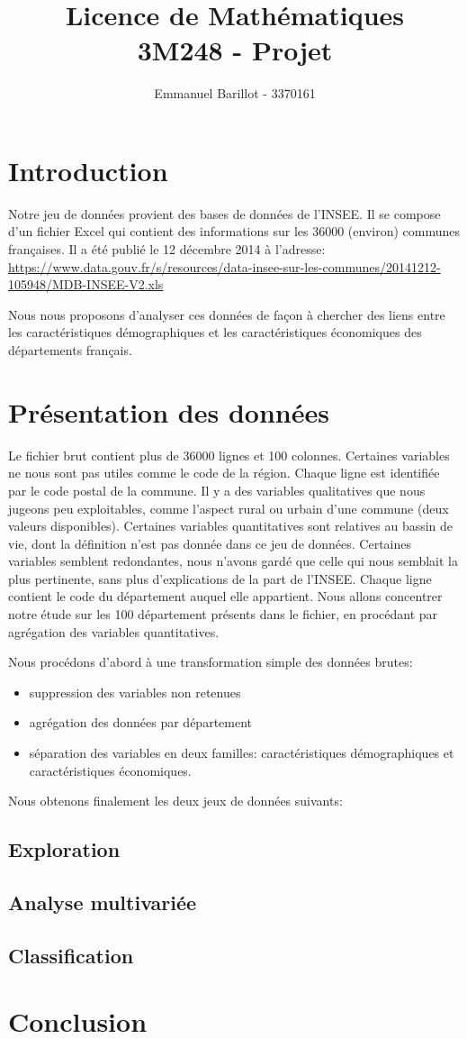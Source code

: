 \documentclass[a4paper,11pt]{article}
\title{Licence de Mathématiques \\3M248 - Projet}
\author{Emmanuel Barillot - 3370161}
\begin{document}
\maketitle



\section{Introduction}
Notre jeu de données provient des bases de données de l'INSEE. Il se compose d'un fichier Excel qui contient des informations sur les 36000 (environ) communes françaises.
Il a été publié le 12 décembre 2014 à l'adresse: 
\href{https://www.data.gouv.fr/s/resources/data-insee-sur-les-communes/20141212-105948/MDB-INSEE-V2.xls}{https://www.data.gouv.fr/s/resources/data-insee-sur-les-communes/20141212-105948/MDB-INSEE-V2.xls}

Nous nous proposons d'analyser ces données de façon à chercher des liens entre les caractéristiques démographiques et les caractéristiques économiques des départements français.

\section{Présentation des données}
Le fichier brut contient plus de 36000 lignes et 100 colonnes.
Certaines variables ne nous sont pas utiles comme le code de la région.
Chaque ligne est identifiée par le code postal de la commune.
Il y a des variables qualitatives que nous jugeons peu exploitables, comme l'aspect rural ou urbain d'une commune (deux valeurs disponibles).
Certaines variables quantitatives sont relatives au bassin de vie, dont la définition n'est pas donnée dans ce jeu de données.
Certaines variables semblent redondantes, nous n'avons gardé que celle qui nous semblait la plus pertinente, sans plus d'explications de la part de l'INSEE.
Chaque ligne contient le code du département auquel elle appartient.
Nous allons concentrer notre étude sur les 100 département présents dans le fichier, en procédant par agrégation des variables quantitatives.


Nous procédons d'abord à une transformation simple des données brutes:
\begin{itemize}
\item suppression des variables non retenues
\item agrégation des données par département
\item séparation des variables en deux familles: caractéristiques démographiques et caractéristiques économiques.
\end{itemize}

Nous obtenons finalement les deux jeux de données suivants:


\subsection{Exploration}
\subsection{Analyse multivariée}
\subsection{Classification}

\section{Conclusion}
\end{document}
